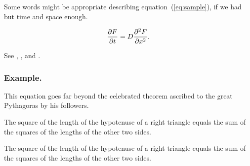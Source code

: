 \documentclass{ifacconf}
\begin{document}
Some words might be appropriate describing equation~(\ref{eq:sample}), if 
we had but time and space enough. 

\begin{equation} \label{eq:sample}
{{\partial F}\over {\partial t}} = D{{\partial^2 F}\over {\partial x^2}}.
\end{equation}

See \cite{Abl:56}, \cite{AbTaRu:54}, \cite{Keo:58} and \cite{Pow:85}.

\subsubsection{Example.} This equation goes far beyond the
celebrated theorem ascribed to the great Pythagoras by his followers.

\begin{thm}   %
The square of the length of the hypotenuse of a right triangle equals
the sum of the squares of the lengths of the other two sides.
\end{thm}

\begin{pf}    %
The square of the length of the hypotenuse of a right triangle equals the sum of the squares 
of the lengths of the other two sides.
\end{pf}

\end{document}
